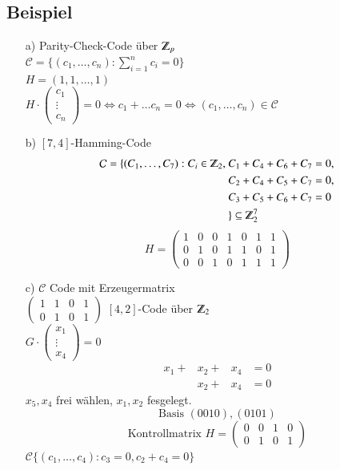 \subsection{Beispiel}
\begin{itemize}
	\item [a)] Parity-Check-Code \"uber $\Z_p$ \\
	$\mathcal{C} = \lbrace (c_1,\ldots,c_n): \sum^n_{i=1}{c_i}=0 \rbrace$\\ %
	$H=(1,1,\ldots,1)$\\
	$H \cdot
	\begin{pmatrix}
	c_1 \\
	\vdots \\
	c_n
	\end{pmatrix}
	= 0 \Leftrightarrow c_1 + \ldots c_n = 0 \Leftrightarrow (c_1,\ldots,c_n) \in \mathcal{C}$
	\item [b)] $[7,4]$-Hamming-Code
	\begin{align*}
	\mathcal{C} = \lbrace (C_1,\ldots,C_7) : C_i \in \Z_2,\ &C_1 + C_4 + C_6 + C_7 = 0,\\
										&C_2 + C_4 + C_5 + C_7 = 0,\\
										&C_3 + C_5 + C_6 + C_7 = 0\\
										 &\rbrace \subseteq \Z_2^7
	\end{align*}
	\[	H=
		\begin{pmatrix}
			1 & 0 & 0 & 1 & 0 & 1 & 1\\
			0 & 1 & 0 & 1 & 1 & 0 & 1\\
			0 & 0 & 1 & 0 & 1 & 1 & 1
		\end{pmatrix}
	\]
	\item [c)] $\mathcal{C}$ Code mit Erzeugermatrix\\
	$
	\begin{pmatrix}
		1 & 1 & 0 & 1\\
		0 & 1 & 0 & 1
	\end{pmatrix}$
	 $[4,2]$-Code \"uber $\Z_2$\\
	 $G \cdot
	 \begin{pmatrix}
	 x_1 \\
	 \vdots \\
	 x_4
	 \end{pmatrix}
	 =0$
	 \begin{align*}
	 	x_1+&x_2 + &x_4&=0\\
	 	&x_2 + &x_4 &=0
	\end{align*}
	$x_5,x_4$ frei w\"ahlen, $x_1,x_2$ fesgelegt.\\
	\[
		\text{Basis }
		(0 0 1 0), (0 1 0 1)
	\]	
	\[
		\text{Kontrollmatrix }
		H=
		\begin{pmatrix}
			0 & 0 & 1 & 0 \\
			0 & 1 & 0 & 1
		\end{pmatrix}
	\]
	$\mathcal{C} \lbrace (c_1,\ldots,c_4) : c_3=0,c_2+c_4=0\rbrace$	
\end{itemize}

